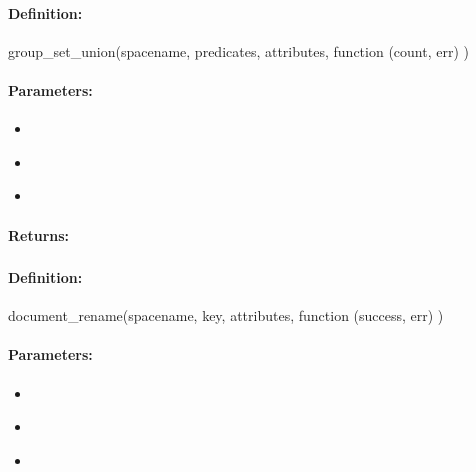 \paragraph{Definition:}
\begin{javascriptcode}
group_set_union(spacename, predicates, attributes, function (count, err) {})
\end{javascriptcode}
\paragraph{Parameters:}
\begin{itemize}[noitemsep]
\item {}\\

\item {}\\

\item {}\\

\end{itemize}

\paragraph{Returns:}


\pagebreak
\subsubsection{}
\label{api:nodejs:document_rename}


\paragraph{Definition:}
\begin{javascriptcode}
document_rename(spacename, key, attributes, function (success, err) {})
\end{javascriptcode}
\paragraph{Parameters:}
\begin{itemize}[noitemsep]
\item {}\\

\item {}\\

\item {}\\

\end{itemize}

